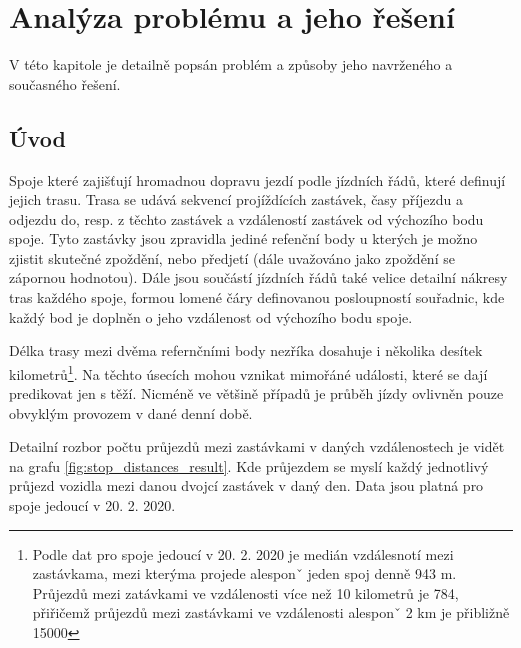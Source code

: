 
\chapter{Analýza problému a jeho řešení}

V této kapitole je detailně popsán problém a způsoby jeho navrženého a současného řešení.

\section{Úvod}

Spoje které zajišťují hromadnou dopravu jezdí podle jízdních řádů, které definují jejich trasu. Trasa se udává sekvencí projíždících zastávek, časy příjezdu a odjezdu do, resp. z těchto zastávek a vzdáleností zastávek od výchozího bodu spoje. Tyto zastávky jsou zpravidla jediné refenční body u kterých je možno zjistit skutečné zpoždění, nebo předjetí (dále uvažováno jako zpoždění se zápornou hodnotou). Dále jsou součástí jízdních řádů také velice detailní nákresy tras každého spoje, formou lomené čáry definovanou posloupností souřadnic, kde každý bod je doplněn o jeho vzdálenost od výchozího bodu spoje.

\bigbreak

Délka trasy mezi dvěma refernčními body nezříka dosahuje i několika desítek kilometrů\footnote{Podle dat pro spoje jedoucí v 20. 2. 2020 je medián vzdálesnotí mezi zastávkama, mezi kterýma projede alesponˇ jeden spoj denně 943 m. Průjezdů mezi zatávkami ve vzdálenosti více než 10 kilometrů je 784, přiřičemž průjezdů mezi zastávkami ve vzdálenosti alesponˇ 2 km je přibližně 15000}. Na těchto úsecích mohou vznikat mimořáné události, které se dají predikovat jen s těží. Nicméně ve většině případů je průběh jízdy ovlivněn pouze obvyklým provozem v dané denní době.

Detailní rozbor počtu průjezdů mezi zastávkami v daných vzdálenostech je vidět na grafu \ref{fig:stop_distances_result}. Kde průjezdem se myslí každý jednotlivý průjezd vozidla mezi danou dvojcí zastávek v daný den. Data jsou platná pro spoje jedoucí v 20. 2. 2020.

